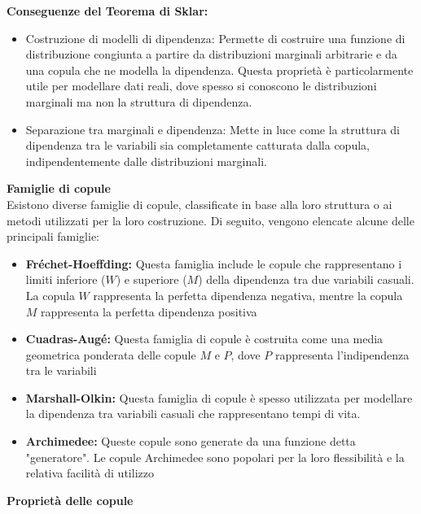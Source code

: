 \documentclass[a4paper,12pt]{article}
\begin{document}
\noindent \textbf{Conseguenze del Teorema di Sklar:}
\begin{itemize}
	\item Costruzione di modelli di dipendenza: Permette di costruire una funzione di distribuzione congiunta a partire da distribuzioni marginali arbitrarie e da una copula che ne modella la dipendenza. Questa proprietà è particolarmente utile per modellare dati reali, dove spesso si conoscono le distribuzioni marginali ma non la struttura di dipendenza.
	\item Separazione tra marginali e dipendenza: Mette in luce come la struttura di dipendenza tra le variabili sia completamente catturata dalla copula, indipendentemente dalle distribuzioni marginali.\\[2\baselineskip]
\end{itemize}

\noindent \textbf{Famiglie di copule} \\

\noindent Esistono diverse famiglie di copule, classificate in base alla loro struttura o ai metodi utilizzati per la loro costruzione. Di seguito, vengono elencate alcune delle principali famiglie:

\renewcommand{\labelitemi}{}
\begin{itemize}
	\item \textbf{Fréchet-Hoeffding:} Questa famiglia include le copule che rappresentano i limiti inferiore ($W$) e superiore ($M$) della dipendenza tra due variabili casuali. La copula $W$ rappresenta la perfetta dipendenza negativa, mentre la copula $M$ rappresenta la perfetta dipendenza positiva
	\item \textbf{Cuadras-Augé:}  Questa famiglia di copule è costruita come una media geometrica ponderata delle copule $M$ e $P$, dove $P$ rappresenta l'indipendenza tra le variabili
	\item \textbf{Marshall-Olkin:}  Questa famiglia di copule è spesso utilizzata per modellare la dipendenza tra variabili casuali che rappresentano tempi di vita.
	\item \textbf{Archimedee:} Queste copule sono generate da una funzione detta "generatore". Le copule Archimedee sono popolari per la loro flessibilità e la relativa facilità di utilizzo
\end{itemize}

\noindent \textbf{Proprietà delle copule} \\
\end{document}
